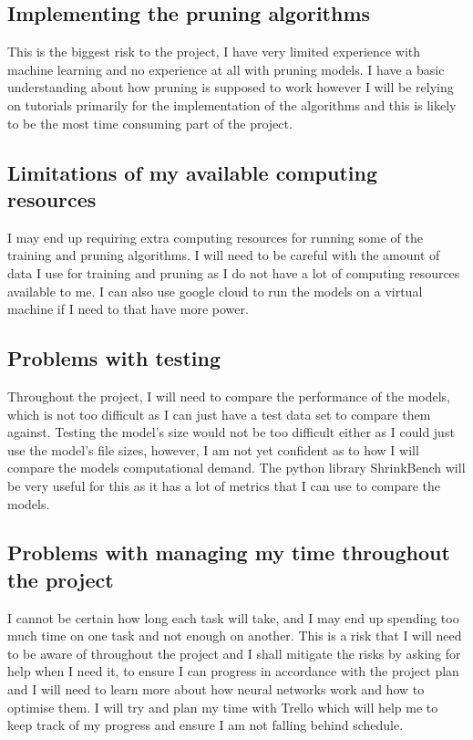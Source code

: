 \documentclass{article}
\begin{document}
\subsection{Implementing the pruning algorithms}
This is the biggest risk to the project, I have very limited experience with machine 
learning and no experience at all with pruning models. I have a basic 
understanding about how pruning is supposed to work however I 
will be relying on tutorials primarily for the implementation of 
the algorithms and this is likely to be the most time consuming part of the project.

\subsection{Limitations of my available computing resources}
I may end up requiring extra computing resources for running some of the training and pruning algorithms.
I will need to be careful with the amount of data I use for training and pruning as I do not have a lot of computing resources available to me.
I can also use google cloud to run the models on a virtual machine if I need to that have more power.

\subsection{Problems with testing}
Throughout the project, I will need to compare the performance of the models, 
which is not too difficult as I can just have a test data set to compare 
them against. Testing the model's size would not be too difficult 
either as I could just use the model's file sizes, however, I am 
not yet confident as to how I will compare the models computational demand.
The python library ShrinkBench \cite{ShrinkBench} will be very useful for this 
as it has a lot of metrics that I can use to compare the models.

\subsection{Problems with managing my time throughout the project}
I cannot be certain how long each task will take, and I may end up spending too much time on one task and not enough on another.
This is a risk that I will need to be aware of throughout the project and I shall mitigate the risks by asking for help when I need it, to ensure I can progress in accordance with the project plan and I will need to learn more about how neural networks work 
and how to optimise them. I will try and plan my time with Trello \cite{Trello} which will help me to keep track of my progress and ensure I am not falling behind schedule.


\pagebreak

\printbibliography
\end{document}
